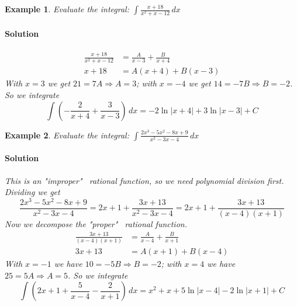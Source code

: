 \documentclass[letterpaper, 11pt, openany]{book}
\theoremstyle{mytheoremstyle}
\theoremstyle{myexamplestyle}
\newtheorem{example}{Example}[section]
\newenvironment{solution}{\paragraph{\sffamily \smaller \fontseries{b}\selectfont Solution}}{\hfill\faSquare}
\begin{document}
\begin{example}\label{e:parfracdlin}
    Evaluate the integral: $\displaystyle \int \frac{x+18}{x^2+x-12} \, dx$
    
    \begin{solution}
        \begin{align*}
            \frac{x+18}{x^2+x-12} &= \frac{A}{x-3} + \frac{B}{x+4}\\[2ex]
            x + 18 &= A(x+4) + B(x-3)
        \end{align*}
        With $x=3$ we get $21 = 7A \Rightarrow A = 3$; with $x=-4$ we get $14 = -7B \Rightarrow B = -2$. So we integrate
        \[\int \left( -\frac{2}{x+4} + \frac{3}{x-3} \right)\, dx = -2\ln |x  + 4| + 3 \ln |x - 3| + C\]
    \end{solution}
\end{example}

\begin{example}\label{e:parfracimprop}
    Evaluate the integral: $\displaystyle \int \frac{2x^{3}- 5 x^{2} - 8x + 9}{x^{2} - 3x - 4} \, dx$
    
    \begin{solution}
        This is an "improper" \faFrown \ rational function, so we need polynomial division first. Dividing we get
        \[\frac{2x^{3}- 5 x^{2} - 8x + 9}{x^{2} - 3x - 4} = 2x + 1 + \frac{3x + 13}{x^{2} - 3x - 4} = 2x + 1 + \frac{3x + 13}{(x-4)(x+1)}\]
        Now we decompose the "proper" \faMeh \ rational function.
        \begin{align*}
            \frac{3x + 13}{(x-4)(x+1)} &= \frac{A}{x-4} + \frac{B}{x+1} \\[2ex]
            3x + 13 &= A(x+1) + B(x-4)
        \end{align*}
        With $x = -1$ we have $10 = -5B \Rightarrow B = -2$; with $x = 4$ we have $25 = 5A \Rightarrow A = 5$. So we integrate
        \[\int \left( 2x + 1 +  \frac{5}{x-4} - \frac{2}{x+1}\right) \, dx = x^{2} + x + 5\ln |x-4| -2\ln |x + 1| + C\]  
    \end{solution}
\end{example}
\end{document}
